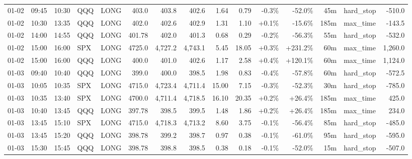 \documentclass[11pt,a4paper,twoside]{article}
\begin{document}
\begin{landscape}
\begin{center}
\begin{longtable}{>{\color{txtmain}}l l l l l r r r r r r r r >{\color{txtmain}}l r}
01-02 & 09:45 & 10:30 & QQQ & LONG & 403.0 & 403.8 & 402.6 & 1.64 & 0.79 & \textcolor{lossred}{-0.3\%} & \textcolor{lossred}{-52.0\%} & 45m & hard\_stop & \textcolor{lossred}{-510.0} \\
01-02 & 10:30 & 13:35 & QQQ & LONG & 402.0 & 402.6 & 402.9 & 1.31 & 1.10 & \textcolor{wingreen}{+0.1\%} & \textcolor{lossred}{-15.6\%} & 185m & max\_time & \textcolor{lossred}{-143.5} \\
01-02 & 14:00 & 14:55 & QQQ & LONG & 401.78 & 402.0 & 401.3 & 0.68 & 0.29 & \textcolor{lossred}{-0.2\%} & \textcolor{lossred}{-56.3\%} & 55m & hard\_stop & \textcolor{lossred}{-532.0} \\
01-02 & 15:00 & 16:00 & SPX & LONG & 4725.0 & 4,727.2 & 4,743.1 & 5.45 & 18.05 & \textcolor{wingreen}{+0.3\%} & \textcolor{wingreen}{+231.2\%} & 60m & max\_time & \textcolor{wingreen}{1,260.0} \\
01-02 & 15:00 & 16:00 & QQQ & LONG & 400.0 & 401.0 & 402.6 & 1.17 & 2.58 & \textcolor{wingreen}{+0.4\%} & \textcolor{wingreen}{+120.1\%} & 60m & max\_time & \textcolor{wingreen}{1,124.0} \\
01-03 & 09:40 & 10:40 & QQQ & LONG & 399.0 & 400.0 & 398.5 & 1.98 & 0.83 & \textcolor{lossred}{-0.4\%} & \textcolor{lossred}{-57.8\%} & 60m & hard\_stop & \textcolor{lossred}{-572.5} \\
01-03 & 10:05 & 10:35 & SPX & LONG & 4715.0 & 4,723.4 & 4,711.4 & 15.00 & 7.15 & \textcolor{lossred}{-0.3\%} & \textcolor{lossred}{-52.3\%} & 30m & hard\_stop & \textcolor{lossred}{-785.0} \\
01-03 & 10:35 & 13:40 & SPX & LONG & 4700.0 & 4,711.4 & 4,718.5 & 16.10 & 20.35 & \textcolor{wingreen}{+0.2\%} & \textcolor{wingreen}{+26.4\%} & 185m & max\_time & \textcolor{wingreen}{425.0} \\
01-03 & 10:40 & 13:45 & QQQ & LONG & 397.78 & 398.5 & 399.5 & 1.48 & 1.86 & \textcolor{wingreen}{+0.2\%} & \textcolor{wingreen}{+26.4\%} & 185m & max\_time & \textcolor{wingreen}{234.0} \\
01-03 & 13:45 & 15:10 & SPX & LONG & 4715.0 & 4,718.3 & 4,713.2 & 8.60 & 3.75 & \textcolor{lossred}{-0.1\%} & \textcolor{lossred}{-56.4\%} & 85m & hard\_stop & \textcolor{lossred}{-485.0} \\
01-03 & 13:45 & 15:20 & QQQ & LONG & 398.78 & 399.2 & 398.7 & 0.97 & 0.38 & \textcolor{lossred}{-0.1\%} & \textcolor{lossred}{-61.0\%} & 95m & hard\_stop & \textcolor{lossred}{-595.0} \\
01-03 & 15:30 & 15:45 & QQQ & LONG & 398.78 & 398.8 & 398.5 & 0.38 & 0.18 & \textcolor{lossred}{-0.1\%} & \textcolor{lossred}{-52.0\%} & 15m & hard\_stop & \textcolor{lossred}{-507.0} \\

\end{longtable}
\end{center}
\end{landscape}
\end{document}
